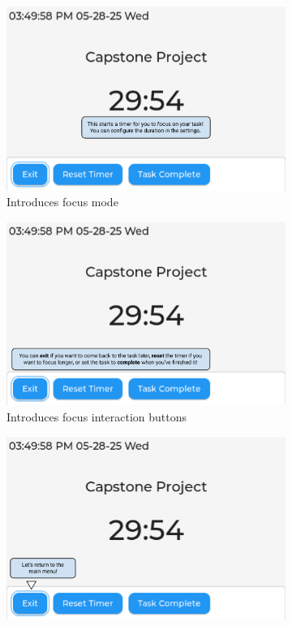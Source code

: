 \begin{figure}
    \ContinuedFloat
    \begin{subfigure}{0.5\textwidth}
        \includegraphics[width = \textwidth]{focus_tutorial.png}
        \caption{Introduces focus mode}
    \end{subfigure}
    \begin{subfigure}{0.5\textwidth}
        \includegraphics[width = \textwidth]{focus_buttons.png}
        \caption{Introduces focus interaction buttons}
    \end{subfigure}
    \begin{subfigure}{0.5\textwidth}
        \includegraphics[width = \textwidth]{Return.png}

\end{subfigure}
\end{figure}
